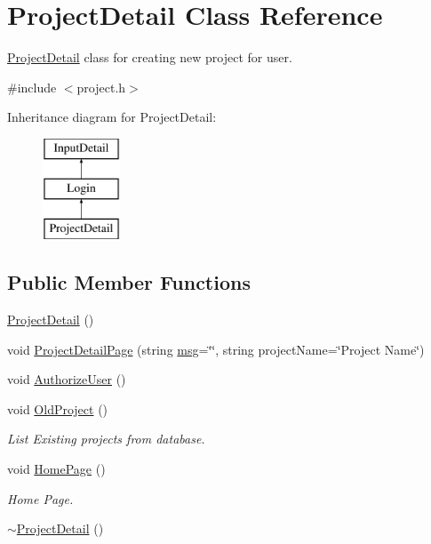 \hypertarget{classProjectDetail}{\section{Project\-Detail Class Reference}
\label{classProjectDetail}
}


\hyperlink{classProjectDetail}{Project\-Detail} class for creating new project for user.  




{\ttfamily \#include $<$project.\-h$>$}

Inheritance diagram for Project\-Detail\-:\begin{figure}[H]
\begin{center}
\leavevmode
\includegraphics[height=3.000000cm]{d3/dd8/classProjectDetail}
\end{center}
\end{figure}
\subsection*{Public Member Functions}
\begin{DoxyCompactItemize}
\item 
\hyperlink{classProjectDetail_a405e8bbc157e30c4ff93871988218d9f}{Project\-Detail} ()
\item 
void \hyperlink{classProjectDetail_a581ccdab5dcd21663b78ebedbbf0d240}{Project\-Detail\-Page} (string \hyperlink{classInputDetail_a1abb16cd695678c3fa05e3c812823fee}{msg}=\char`\"{}\char`\"{}, string project\-Name=\char`\"{}Project Name\char`\"{})
\item 
void \hyperlink{classProjectDetail_ab78c9e2a0cd5079c427638a5a3971c28}{Authorize\-User} ()
\item 
\hypertarget{classProjectDetail_ab92c992a37524a5f90fdcaf4868ac218}{void \hyperlink{classProjectDetail_ab92c992a37524a5f90fdcaf4868ac218}{Old\-Project} ()}\label{classProjectDetail_ab92c992a37524a5f90fdcaf4868ac218}

\begin{DoxyCompactList}\small\item\em List Existing projects from database. \end{DoxyCompactList}\item 
\hypertarget{classProjectDetail_aa36fe7134da17688018870ae8ebf2191}{void \hyperlink{classProjectDetail_aa36fe7134da17688018870ae8ebf2191}{Home\-Page} ()}\label{classProjectDetail_aa36fe7134da17688018870ae8ebf2191}

\begin{DoxyCompactList}\small\item\em Home Page. \end{DoxyCompactList}\item 
\hyperlink{classProjectDetail_ab4719d14d9efb8811916f5d691099c8f}{$\sim$\-Project\-Detail} ()
\end{DoxyCompactItemize}
